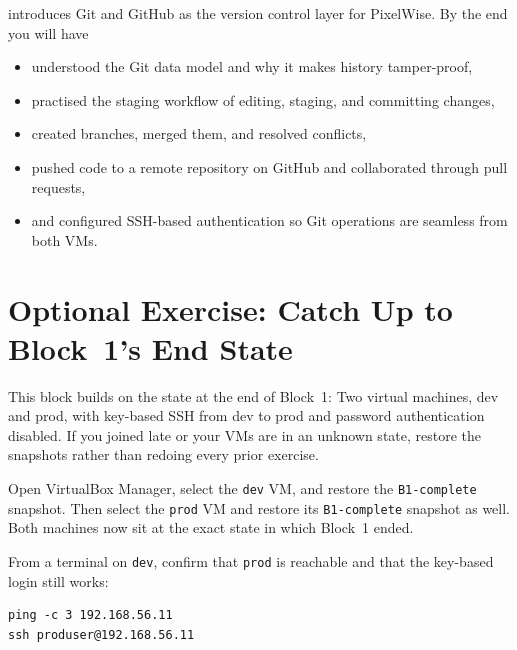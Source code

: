  introduces Git and GitHub as the version control layer for PixelWise.
By the end you will have
\begin{itemize}
    \item understood the Git data model and why it makes history tamper-proof,
    \item practised the staging workflow of editing, staging, and committing changes,
    \item created branches, merged them, and resolved conflicts,
    \item pushed code to a remote repository on GitHub and collaborated through pull requests,
    \item and configured SSH-based authentication so Git operations are seamless from both VMs.
\end{itemize}



\newpage
\section{Optional Exercise: Catch Up to Block~1's End State}

This block builds on the state at the end of Block~1: Two virtual machines, dev and prod, with key-based SSH from dev to prod and password authentication disabled. If you joined late or your VMs are in an unknown state, restore the snapshots rather than redoing every prior exercise.


Open VirtualBox Manager, select the \texttt{dev} VM, and restore the \texttt{B1-complete} snapshot.
Then select the \texttt{prod} VM and restore its \texttt{B1-complete} snapshot as well.
Both machines now sit at the exact state in which Block~1 ended.

From a terminal on \texttt{dev}, confirm that \texttt{prod} is reachable and that the
key-based login still works:

\begin{verbatim}
ping -c 3 192.168.56.11
ssh produser@192.168.56.11
\end{verbatim}


